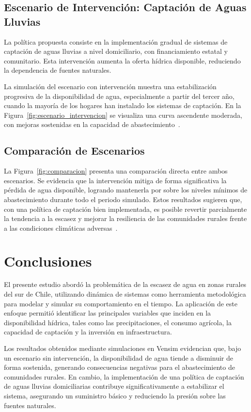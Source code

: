 \documentclass[10pt]{article}
\begin{document}
\subsection{Escenario de Intervención: Captación de Aguas Lluvias}

La política propuesta consiste en la implementación gradual de sistemas de captación de aguas lluvias a nivel domiciliario, con financiamiento estatal y comunitario. Esta intervención aumenta la oferta hídrica disponible, reduciendo la dependencia de fuentes naturales.

La simulación del escenario con intervención muestra una estabilización progresiva de la disponibilidad de agua, especialmente a partir del tercer año, cuando la mayoría de los hogares han instalado los sistemas de captación. En la Figura~\ref{fig:escenario_intervencion} se visualiza una curva ascendente moderada, con mejoras sostenidas en la capacidad de abastecimiento~\parencite{mop2019}.
\subsection{Comparación de Escenarios}
La Figura~\ref{fig:comparacion} presenta una comparación directa entre ambos escenarios. Se evidencia que la intervención mitiga de forma significativa la pérdida de agua disponible, logrando mantenerla por sobre los niveles mínimos de abastecimiento durante todo el periodo simulado.
Estos resultados sugieren que, con una política de captación bien implementada, es posible revertir parcialmente la tendencia a la escasez y mejorar la resiliencia de las comunidades rurales frente a las condiciones climáticas adversas~\parencite{cr2,vensimdocs}.
\section{Conclusiones}
El presente estudio abordó la problemática de la escasez de agua en zonas rurales del sur de Chile, utilizando dinámica de sistemas como herramienta metodológica para modelar y simular su comportamiento en el tiempo. La aplicación de este enfoque permitió identificar las principales variables que inciden en la disponibilidad hídrica, tales como las precipitaciones, el consumo agrícola, la capacidad de captación y la inversión en infraestructura.

Los resultados obtenidos mediante simulaciones en Vensim evidencian que, bajo un escenario sin intervención, la disponibilidad de agua tiende a disminuir de forma sostenida, generando consecuencias negativas para el abastecimiento de comunidades rurales. En cambio, la implementación de una política de captación de aguas lluvias domiciliarias contribuye significativamente a estabilizar el sistema, asegurando un suministro básico y reduciendo la presión sobre las fuentes naturales.
\end{document}
